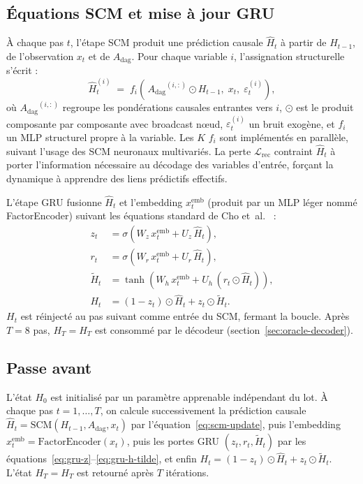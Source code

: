 \documentclass[14pt,a4paper,openany]{extreport}
\theoremstyle{definition}
\newcommand{\Adag}{\ensuremath{A_{\mathrm{dag}}}}
\newcommand{\HT}{\ensuremath{H_T}}
\newcommand{\Lrec}{\ensuremath{\mathcal{L}_{\mathrm{rec}}}}
\begin{document}
\subsection{Équations SCM et mise à jour GRU}
\label{ssec:oracle-rcn-scm}

À chaque pas $t$, l'étape SCM produit une prédiction causale $\hat{H}_t$ à partir de $H_{t-1}$, de l'observation $x_t$ et de $\Adag$. Pour chaque variable $i$, l'assignation structurelle s'écrit :
\begin{equation}
  \hat{H}_t^{(i)} \;=\; f_i\!\left(\, \Adag^{(i,:)} \odot H_{t-1},\; x_t,\; \varepsilon_t^{(i)} \right),
  \label{eq:scm-update}
\end{equation}
où $\Adag^{(i,:)}$ regroupe les pondérations causales entrantes vers $i$, $\odot$ est le produit composante par composante avec broadcast nœud, $\varepsilon_t^{(i)}$ un bruit exogène, et $f_i$ un MLP structurel propre à la variable. Les $K$ $f_i$ sont implémentés en parallèle, suivant l'usage des SCM neuronaux multivariés. La perte $\Lrec$ contraint $\hat{H}_t$ à porter l'information nécessaire au décodage des variables d'entrée, forçant la dynamique à apprendre des liens prédictifs effectifs.

L'étape GRU fusionne $\hat{H}_t$ et l'embedding $x_t^{\mathrm{emb}}$ (produit par un MLP léger nommé FactorEncoder) suivant les équations standard de Cho et~al.~\cite{cho_gru_2014} :
\begin{align}
  z_t &= \sigma\!\left( W_z\, x_t^{\mathrm{emb}} + U_z\, \hat{H}_t \right), \label{eq:gru-z}\\
  r_t &= \sigma\!\left( W_r\, x_t^{\mathrm{emb}} + U_r\, \hat{H}_t \right), \label{eq:gru-r}\\
  \tilde{H}_t &= \tanh\!\left( W_h\, x_t^{\mathrm{emb}} + U_h\, (r_t \odot \hat{H}_t) \right), \label{eq:gru-h-tilde}\\
  H_t &= (1 - z_t) \odot \hat{H}_t + z_t \odot \tilde{H}_t. \label{eq:gru-h}
\end{align}
$H_t$ est réinjecté au pas suivant comme entrée du SCM, fermant la boucle. Après $T=8$ pas, $\HT = H_T$ est consommé par le décodeur (section~\ref{sec:oracle-decoder}).

\subsection{Passe avant}
\label{ssec:oracle-rcn-pseudocode}

L'état $H_0$ est initialisé par un paramètre apprenable indépendant du lot. À chaque pas $t=1,\ldots,T$, on calcule successivement la prédiction causale $\hat{H}_t = \mathrm{SCM}(H_{t-1}, \Adag, x_t)$ par l'équation~\eqref{eq:scm-update}, puis l'embedding $x_t^{\mathrm{emb}} = \mathrm{FactorEncoder}(x_t)$, puis les portes GRU $(z_t, r_t, \tilde{H}_t)$ par les équations~\eqref{eq:gru-z}--\eqref{eq:gru-h-tilde}, et enfin $H_t = (1 - z_t) \odot \hat{H}_t + z_t \odot \tilde{H}_t$. L'état $\HT = H_T$ est retourné après $T$ itérations.
\end{document}

